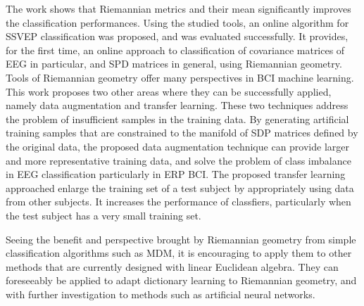 The work shows that Riemannian metrics and their mean significantly improves the classification performances.
Using the studied tools, an online algorithm for SSVEP classification was proposed, and was evaluated successfully. 
It provides, for the first time, an online approach to classification of covariance matrices of EEG in particular, and SPD matrices in general, using Riemannian geometry. 
Tools of Riemannian geometry offer many perspectives in BCI machine learning.
This work proposes two other areas where they can be successfully applied, namely data augmentation and transfer learning.
These two techniques address the problem of insufficient samples in the training data. 
By generating artificial training samples that are constrained to the manifold of SDP matrices defined by the original data, the proposed data augmentation technique can provide larger and more representative training data, and solve the problem of class imbalance in EEG classification particularly in ERP BCI.
The proposed transfer learning approached enlarge the training set of a test subject by appropriately using data from other subjects. 
It increases the performance of classfiers, particularly when the test subject has a very small training set. 

Seeing the benefit and perspective brought by Riemannian geometry from simple classification algorithms such as MDM, it is encouraging to apply them to other methods that are currently designed with linear Euclidean algebra. 
They can foreseeably be applied to adapt dictionary learning to Riemannian geometry, and with further investigation to methods such as artificial neural networks.        
